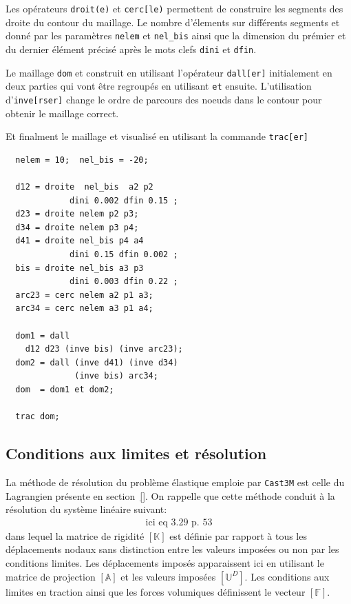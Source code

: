 \begin{castemcom}
Les opérateurs \texttt{droit(e)} 
et \texttt{cerc[le)} permettent de construire les 
segments des droite du contour du maillage. Le 
nombre d'élements sur différents segments et donné par 
les paramètres \texttt{nelem} et 
\texttt{nel\_bis} ainsi que la dimension du prémier 
et du dernier élément précisé après le mots clefs 
\texttt{dini} et \texttt{dfin}. 

Le maillage \texttt{dom} et construit en utilisant 
l'opérateur \texttt{dall[er]} initialement en deux parties 
qui vont être regroupés en utilisant \texttt{et} ensuite.
L'utilisation  d'\texttt{inve[rser]} change le ordre de 
parcours des noeuds dans le contour pour obtenir 
le maillage correct. 

Et finalment le maillage et visualisé en utilisant
la commande \texttt{trac[er]}  
\end{castemcom}
\begin{castemlines}
\begin{verbatim}
  nelem = 10;  nel_bis = -20;

  d12 = droite  nel_bis  a2 p2 
             dini 0.002 dfin 0.15 ;
  d23 = droite nelem p2 p3;
  d34 = droite nelem p3 p4;
  d41 = droite nel_bis p4 a4 
             dini 0.15 dfin 0.002 ;
  bis = droite nel_bis a3 p3 
             dini 0.003 dfin 0.22 ;
  arc23 = cerc nelem a2 p1 a3;
  arc34 = cerc nelem a3 p1 a4;   

  dom1 = dall 
    d12 d23 (inve bis) (inve arc23);
  dom2 = dall (inve d41) (inve d34) 
              (inve bis) arc34;
  dom  = dom1 et dom2;
  
  trac dom;

\end{verbatim}
\end{castemlines}

\subsection*{Conditions aux limites et résolution}

La méthode de résolution du problème élastique emploie par \texttt{Cast3M}
est celle du Lagrangien présente en section~\ref{}. On rappelle que cette 
méthode conduit à la résolution du système linéaire suivant:
\begin{eqnarray}
 \text{ici eq 3.29 p. 53}
\end{eqnarray}   
dans lequel la matrice de rigidité $[\mathbb{K}]$ est définie par rapport 
à tous les déplacements nodaux sans distinction entre les valeurs imposées
ou non par les conditions limites. Les déplacements 
imposés apparaissent ici en utilisant le matrice de projection $[\mathbb{A}]$ 
et les valeurs imposées $[\mathbb{U}^D]$. Les conditions aux limites 
en traction ainsi que les forces volumiques définissent le vecteur 
$[\mathbb{F}]$.   

